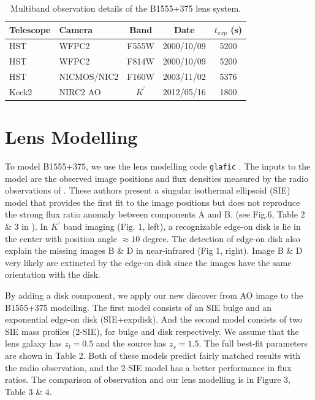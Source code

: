 \documentclass[useAMS,usenatbib]{mn2e}
\begin{document}
\begin{table}
 \centering
  \caption{Multiband observation details of the B1555+375 lens system.}
  \begin{tabular}{@{}llccc}
  
\hline
  Telescope     &      Camera     &  Band & Date &$t_{exp}$ (s) \\

 \hline
   HST				&		WFPC2    &  F555W		&	2000/10/09 	&	5200\\
   HST				&		WFPC2    &  F814W		&	2000/10/09 &	5200\\
   HST				&		NICMOS/NIC2	&	F160W	&	2003/11/02 & 5376\\
   Keck2			&		NIRC2 AO	&   $K^\prime$	& 2012/05/16	&  1800\\
   \hline
\end{tabular}
\end{table}


\section{Lens Modelling}

To model B1555+375, we use the lens modelling code {\tt glafic}
\citep{Oguri}.  The inputs to the model are the observed image positions
and flux densities measured by the radio observations of \citet{Marlow}.
These authors present a singular isothermal ellipsoid (SIE) model that
provides the first fit to the image positions but
does not reproduce the strong flux ratio anomaly between components A and B.
(see Fig.6, Table 2 \& 3 in \citet{Marlow}). In $K^\prime$ band
imaging (Fig. 1, left), a recognizable edge-on disk is lie in the center
with position angle $\approx 10$ degree. The detection of edge-on disk also explain the missing images B \& D in near-infrared (Fig 1, right). Image B \& D very likely are extincted by the edge-on disk since the images have the same orientation with the disk. 

By adding a disk component, we apply our new discover from AO image to the
B1555+375 modelling. The first model consists of an SIE bulge
and an exponential edge-on disk (SIE+expdisk). And the second model
consists of two SIE mass profiles (2-SIE), for bulge and disk
respectively. We assume that the lens galaxy has $z_{l}=0.5$ and the source has $z_s=1.5$. The full best-fit parameters are shown in Table 2. Both
of these models predict fairly matched results with the radio
observation, and the 2-SIE model has a better performance in flux ratios. The comparison of observation and our lens modelling is
in Figure 3, Table 3 \& 4.
\end{document}
